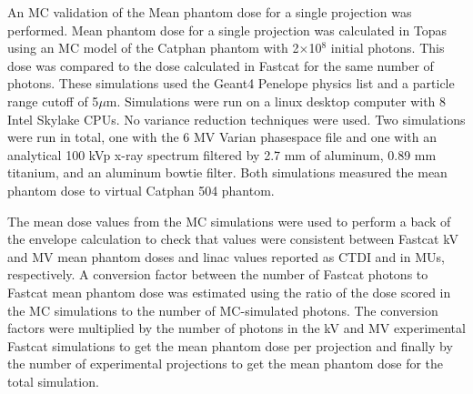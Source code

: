 An MC validation of the Mean phantom dose for a single projection was performed. Mean phantom dose for a single projection was calculated in Topas \cite{Perl2012Topas:Applications} using an MC model of the Catphan phantom with 2$\times$10$^8$ initial photons. This dose was compared to the dose calculated in Fastcat for the same number of photons. These simulations used the Geant4 Penelope physics list and a particle range cutoff of 5$\mu$m. Simulations were run on a linux desktop computer with 8 Intel Skylake CPUs. No variance reduction techniques were used. Two simulations were run in total, one with the 6 MV Varian phasespace file and one with an analytical 100 kVp x-ray spectrum filtered by 2.7 mm of aluminum, 0.89 mm titanium, and an aluminum bowtie filter. Both simulations measured the mean phantom dose to virtual Catphan 504 phantom.

The mean dose values from the MC simulations were used to perform a back of the envelope calculation to check that values were consistent between Fastcat kV and MV mean phantom doses and linac values reported as CTDI and in MUs, respectively. A conversion factor between the number of Fastcat photons to Fastcat mean phantom dose was estimated using the ratio of the dose scored in the MC simulations to the number of MC-simulated photons. The conversion factors were multiplied by the number of photons in the kV and MV experimental Fastcat simulations to get the mean phantom dose per projection and finally by the number of experimental projections to get the mean phantom dose for the total simulation.

